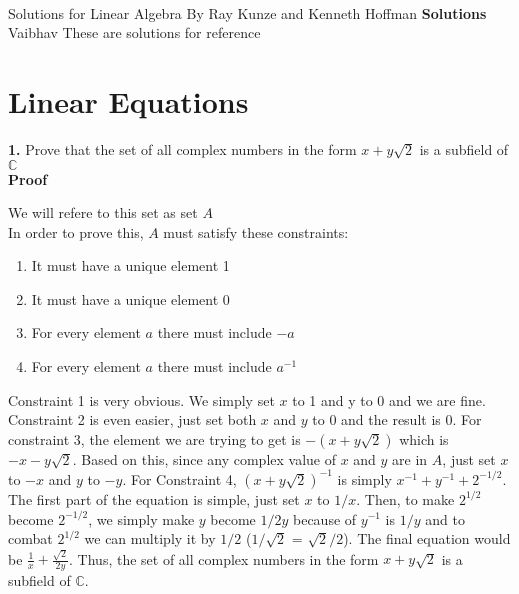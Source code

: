 \documentclass[11pt]{article}
\begin{document}
\thispagestyle{empty}
\bigskip \
\vspace{0.1cm}

\begin{center}
{\fontsize{22}{22} \selectfont Solutions for Linear Algebra By Ray Kunze and Kenneth Hoffman}
\vskip 16pt
{\fontsize{36}{36} \selectfont \bf \sffamily Solutions}
\vskip 24pt
{\fontsize{18}{18} \selectfont \rmfamily Vaibhav} 
\vskip 24pt
These are solutions for reference
\end{center}


\newpage
\microtoc
\newpage

\section{Linear Equations}
\textbf{1.} Prove that the set of all complex numbers in the form $x + y\sqrt{2}$ is a subfield of $\mathbb{C}$\\

\textbf{Proof}

We will refere to this set as set \textbf{$A$}\\

In order to prove this, $A$ must satisfy these constraints:
\begin{enumerate}
  \item{It must have a unique element 1}
  \item{It must have a unique element 0}
  \item{For every element $a$ there must include $-a$}
  \item{For every element $a$ there must include $a^{-1}$}\\
\end{enumerate}

Constraint 1 is very obvious. We simply set $x$ to 1 and y to $0$ and we are fine. Constraint 2 is even easier, just set both $x$ and $y$ to 0 and the result is 0. For constraint 3, the element we are trying to get is $-(x + y\sqrt{2})$ which is $-x-y\sqrt{2}$. Based on this, since any complex value of $x$ and $y$ are in $A$, just set $x$ to $-x$ and $y$ to $-y$. For Constraint 4, $(x + y\sqrt{2})^{-1}$ is simply $x^{-1} + y^{-1} + 2^{-1/2}$. The first part of the equation is simple, just set $x$ to $1/{x}$. Then, to make $2^{1/2}$ become $2^{-1/2}$, we simply make $y$  become $1/2y$ because of $y^{-1}$ is $1/y$ and to combat $2^{1/2}$ we can multiply it by $1/2$ ($1/\sqrt{2}$ = $\sqrt{2}/2$). The final equation would be $\frac{1}{x} + \frac{\sqrt{2}}{2y}$. Thus, the set of all complex numbers in the form $x + y\sqrt{2}$ is a subfield of $\mathbb{C}$.
\\
\end{document}
